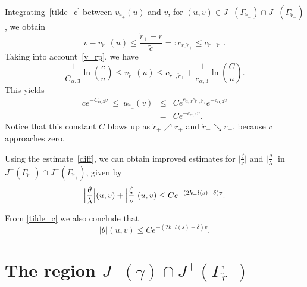 \documentclass[a4paper,11pt,oneside,reqno]{amsart}
\newcommand{\kk}{k_+}
\newcommand{\ckrm}{\check r_-}
\newcommand{\ckrp}{\check r_+}
\begin{document}
Integrating~\eqref{tilde_c} between $v_{\ckrp}(u)$ and $v$, for 
$(u,v)\in J^-(\Gamma_{\ckrm})\cap J^+(\Gamma_{\ckrp})$, we obtain
\begin{equation}\label{diff}
v-v_{\ckrp}(u)\leq{\textstyle\frac{\ckrp-r}{\tilde c}}=:
 c_{r,\ckrp}\leq c_{\ckrm,\ckrp}.
\end{equation}
Taking into account~\eqref{v_rp}, we have
\begin{equation}
\label{v_rm}
\frac{1}{C_{\alpha,3}}\ln\left(\frac{c}{u}\right)\leq v_{\ckrm}(u)\leq
c_{\ckrm,\ckrp}+\frac{1}{c_{\alpha,3}}\ln\left(\frac{C}{u}\right).
\end{equation}
This yields
\begin{eqnarray}
\label{u_rm}
ce^{-C_{\alpha,3}v}\ \leq\ u_{\ckrm}(v)&\leq& Ce^{c_{\alpha,3}c_{\ckrm,\ckrp}}
e^{-c_{\alpha,3}v}\\
&=&Ce^{-c_{\alpha,3}v}.\nonumber
\end{eqnarray}
Notice that this constant $C$ blows up as $\ckrp\nearrow r_+$ and $\ckrm\searrow r_-$, because $\tilde c$ approaches zero.

Using the estimate~\eqref{diff}, we can obtain improved estimates for
$\bigl|\frac{\zeta}{\nu}\bigr|$ and $\bigl|\frac{\theta}{\lambda}\bigr|$
in $J^-(\Gamma_{\ckrm})\cap J^+(\Gamma_{\ckrp})$, given by
\begin{equation}\label{zt-0_ii_a}
\Bigl|\frac\theta\lambda\Bigr|(u,v)+\Bigl|\frac{\zeta}{\nu}\Bigr|(u,v)\leq 
Ce^{-(2\kk l(s)-\delta)v}.
\end{equation}

From \eqref{tilde_c} we also conclude that
\begin{equation}
|\theta|(u,v)\leq 
Ce^{-(2\kk l(s)-\delta)v}. \label{theta_no_shift}
\end{equation}


\section{The region $J^-(\gamma)\cap J^+(\Gamma_{\ckrm})$}\label{section7}
\end{document}
